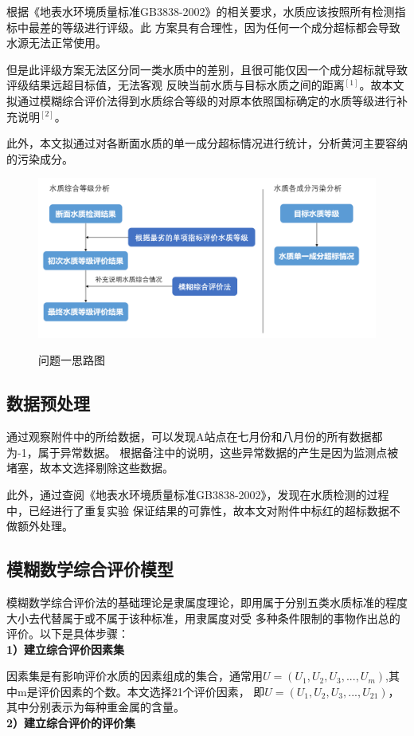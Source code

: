 \documentclass{whutmod}
\begin{document}
\begin{spacing}{1.2}
根据《地表水环境质量标准GB3838-2002》的相关要求，水质应该按照所有检测指标中最差的等级进行评级。此
方案具有合理性，因为任何一个成分超标都会导致水源无法正常使用。

但是此评级方案无法区分同一类水质中的差别，且很可能仅因一个成分超标就导致评级结果远超目标值，无法客观
反映当前水质与目标水质之间的距离$^{[1]}$。故本文拟通过模糊综合评价法得到水质综合等级的对原本依照国标确定的水质等级进行补充说明$^{[2]}$。

此外，本文拟通过对各断面水质的单一成分超标情况进行统计，分析黄河主要容纳的污染成分。
\begin{figure}[H]
	\centering
	\includegraphics[width=.8\textwidth]{问题一思路图.png}
	\label{问题一思路图}
	\caption{问题一思路图}
\end{figure}




\subsection{数据预处理}
通过观察附件中的所给数据，可以发现A站点在七月份和八月份的所有数据都为-1，属于异常数据。
根据备注中的说明，这些异常数据的产生是因为监测点被堵塞，故本文选择剔除这些数据。

此外，通过查阅《地表水环境质量标准GB3838-2002》，发现在水质检测的过程中，已经进行了重复实验
保证结果的可靠性，故本文对附件中标红的超标数据不做额外处理。



\subsection{模糊数学综合评价模型}

模糊数学综合评价法的基础理论是隶属度理论，即用属于分别五类水质标准的程度大小去代替属于或不属于该种标准，用隶属度对受
多种条件限制的事物作出总的评价。以下是具体步骤：
~\\
\textbf{1）建立综合评价因素集}
	 
因素集是有影响评价水质的因素组成的集合，通常用$U=(U_1,U_2,U_3,...,U_m)$,其中m是评价因素的个数。本文选择21个评价因素，
即$U=(U_1,U_2,U_3,...,U_21)$，其中分别表示为每种重金属的含量。
~\\
\textbf{2）建立综合评价的评价集}


\end{spacing}
\end{document}
